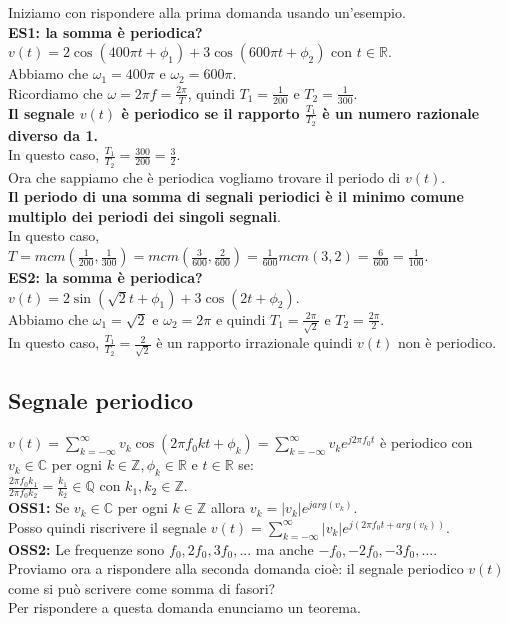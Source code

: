 	Iniziamo con rispondere alla prima domanda usando un'esempio.\\
	\textbf{ES1: la somma è periodica?}\\
	$ v(t) 
	= 2 \cos ( 400 \pi t + \phi_1) + 3 \cos ( 600 \pi t + \phi_2)$ 
	con $ t \in \mathbb{R}$.\\
	Abbiamo che $ \omega_1 = 400 \pi $ e $ \omega_2 = 600 \pi $.\\
	Ricordiamo che $ \omega = 2 \pi f = \frac{2 \pi }{T}$, quindi $ T_1 = \frac{1}{200}$ e $ T_2 = \frac{1}{300} $.\\
	\textbf{Il segnale $ v(t)$ è periodico se il rapporto $ \frac{T_1}{T_2}$ è un numero razionale diverso da 1.}\\
	In questo caso, $ \frac{T_1}{T_2} = \frac{ 300 }{ 200 } = \frac{3}{2}$.\\
	Ora che sappiamo che è periodica vogliamo trovare il periodo di $ v(t)$.\\
	\textbf{Il periodo di una somma di segnali periodici è il minimo comune multiplo dei periodi dei singoli segnali}.\\
	In questo caso,
	$
		T
		= mcm(\frac{1}{200},\frac{1}{300})
		= mcm(\frac{3}{600},\frac{2}{600})
		= \frac{1}{600} mcm(3,2)
		= \frac{6}{600}
		= \frac{1}{100}
	$.\\
	\textbf{ES2: la somma è periodica?}\\
	$ v(t) 
	= 2 \sin ( \sqrt{2} t + \phi_1) + 3 \cos ( 2 t + \phi_2)$.\\
	Abbiamo che $ \omega_1 = \sqrt{2} $ e $ \omega_2 = 2 \pi $ e quindi $ T_1 = \frac{ 2 \pi}{ \sqrt{2} }$ e $ T_2 = \frac{ 2 \pi}{ 2} $.\\
	In questo caso, $ \frac{T_1}{T_2} = \frac{ 2 }{ \sqrt{2} } $ è un rapporto irrazionale quindi $ v(t)$ non è periodico.\\
	
	\subsection{Segnale periodico}
	$
		v(t)
		= \sum_{k= -\infty}^{\infty} v_k \cos ( 2 \pi f_0 kt + \phi_k)
		= \sum_{k= -\infty}^{\infty} v_k e^{ j 2 \pi f_0 t}
	$ è periodico con $ v_k \in \mathbb{C}$ per ogni $ k \in \mathbb{Z}, \phi_k \in \mathbb{R} $ e $ t \in \mathbb{R}$ se:\\
	$
		\frac{ 2 \pi f_0 k_1}{2 \pi f_0 k_2}
		= \frac{k_1}{k_2}
		\in \mathbb{Q}
	$ con $k_1,k_2 \in \mathbb{Z}$.\\
	
	\textbf{OSS1:} Se $ v_k \in \mathbb{C}$ per ogni $ k \in \mathbb{Z}$ allora $ v_k = |v_k|e^{j arg(v_k)} $.\\
	Posso quindi riscrivere il segnale $ v(t) = \sum_{k= -\infty}^{\infty} |v_k| e^{j(2 \pi f_0 t + arg(v_k) )}$.\\
	\textbf{OSS2:} Le frequenze sono $f_0,2f_0,3f_0,... $ ma anche $-f_0,-2f_0,-3f_0,... $.\\
	Proviamo ora a rispondere alla seconda domanda cioè: il segnale periodico $ v(t)$ come si può scrivere come somma di fasori?\\
	Per rispondere a questa domanda enunciamo un teorema.
	
